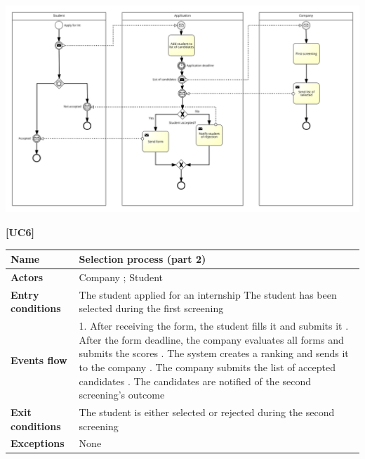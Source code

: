 \documentclass[11pt,twoside]{article}
\begin{document}
\begin{center}
\includegraphics[width=\textwidth]{Images/UC5}
\end{center}

\newpage

\large{\textbf{[UC6]}}
\begin{table}[H]
\begin{tabular}{| p{} | p{} |}
\hline
\textbf{Name}
& Selection process (part 2) \\
\hline
\textbf{Actors}
& Company ; Student \\
\hline
\textbf{Entry conditions}
& The student applied for an internship \newline
The student has been selected during the first screening \\
\hline
\textbf{Events flow}
& 1. After receiving the form, the student fills it and submits it \newline
2. After the form deadline, the company evaluates all forms and submits the scores \newline
3. The system creates a ranking and sends it to the company \newline
4. The company submits the list of accepted candidates \newline
5. The candidates are notified of the second screening's outcome \\
\hline
\textbf{Exit conditions}
& The student is either selected or rejected during the second screening \\
\hline
\textbf{Exceptions}
& None \\
\hline
\end{tabular}
\end{table}
\end{document}
